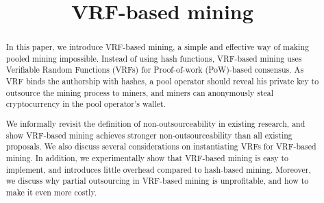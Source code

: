 \documentclass[conference]{IEEEtran}
\begin{document}
\title{VRF-based mining}


\maketitle

\begin{abstract}
  In this paper, we introduce VRF-based mining, a simple and effective way of making pooled mining impossible.
  Instead of using hash functions, VRF-based mining uses Verifiable Random Functions (VRFs) for Proof-of-work (PoW)-based consensus.
  As VRF binds the authorship with hashes, a pool operator should reveal his private key to outsource the mining process to miners, and miners can anonymously steal cryptocurrency in the pool operator's wallet.
  
  We informally revisit the definition of non-outsourceability in existing research, and show VRF-based mining achieves stronger non-outsourceability than all existing proposals.
  We also discuss several considerations on instantiating VRFs for VRF-based mining.
  In addition, we experimentally show that VRF-based mining is easy to implement, and introduces little overhead compared to hash-based mining.
  Moreover, we discuss why partial outsourcing in VRF-based mining is unprofitable, and how to make it even more costly.
\end{abstract}















\appendix

\end{document}
